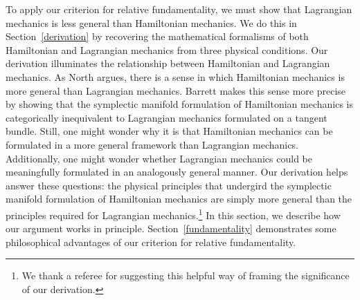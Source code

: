 \documentclass[12pt, twoside]{article}
\begin{document}
To apply our criterion for relative fundamentality, we must show that Lagrangian mechanics is less general than Hamiltonian mechanics. We do this in Section~\ref{derivation} by recovering the mathematical formalisms of both Hamiltonian and Lagrangian mechanics from three physical conditions. {\color{green}Our derivation illuminates the relationship between Hamiltonian and Lagrangian mechanics. As North \parencites*[]{North} argues, there is a sense in which Hamiltonian mechanics is more general than Lagrangian mechanics. Barrett \parencites*[]{Barrett2} makes this sense more precise by showing that the symplectic manifold formulation of Hamiltonian mechanics is categorically inequivalent to Lagrangian mechanics formulated on a tangent bundle. Still, one might wonder why it is that Hamiltonian mechanics can be formulated in a more general framework than Lagrangian mechanics. Additionally, one might wonder whether Lagrangian mechanics could be meaningfully formulated in an analogously general manner. Our derivation helps answer these questions: the physical principles that undergird the symplectic manifold formulation of Hamiltonian mechanics are simply more general than the principles required for Lagrangian mechanics.}\footnote{{\color{green}We thank a referee for suggesting this helpful way of framing the significance of our derivation.}} In this section, we describe how our argument works in principle. Section~\ref{fundamentality} demonstrates some philosophical advantages of our criterion for relative fundamentality.

\end{document}
